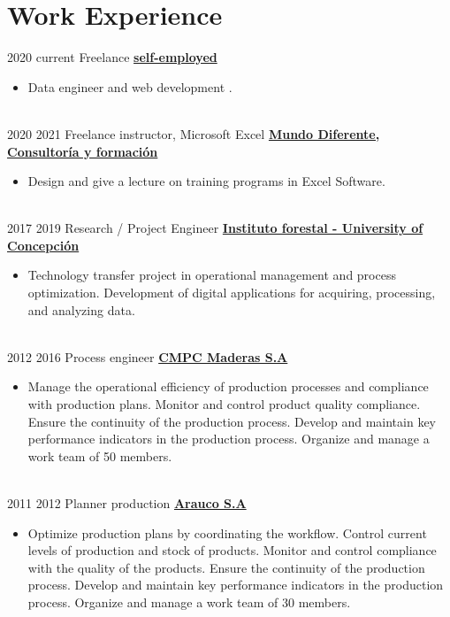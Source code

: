 \documentclass[letterpaper]{DS_class_file} %
\begin{document}
\section{Work Experience}
\begin{twenty}
		\twentyitem
	{2020}
	{current}
	{\hspace{0.2cm}Freelance}
	{\href{https://portfolio-mparraf.herokuapp.com/}{\hspace{0.05cm} \textbf{self-employed} }}
	{}
	{\begin{itemize}
			\item Data engineer and web development .
	\end{itemize}}
	\\
	\twentyitem
	{2020}
	{2021}
	{\hspace{0.2cm}Freelance instructor, Microsoft Excel}
	{\href{https://www.mundodiferente.cl/}{\hspace{0.05cm} \textbf{Mundo Diferente, Consultoría y formación} }}
	{}
	{\begin{itemize}
			\item Design and give a lecture on training programs in Excel Software.
	\end{itemize}}
	\\
	\twentyitem
	{2017}
	{2019}
	{\hspace{0.3cm}Research / Project Engineer}
	{\href{https://www.infor.cl/}{\hspace{0.05cm} \textbf{Instituto forestal -  University of Concepción} }}
	{}
	{\begin{itemize}
			\item Technology transfer project in operational management and process optimization. Development of digital applications for acquiring, processing, and analyzing data.
	\end{itemize}}
	\\
	\twentyitem
	{2012}
	{2016}
	{\hspace{0.3cm}Process engineer}
	{\href{https://www.cmpcmaderas.com/}{\textbf{CMPC Maderas S.A}}}
	{}
	{\begin{itemize}
			\item Manage the operational efficiency of production processes and compliance with production plans. Monitor and control product quality compliance. Ensure the continuity of the production process. Develop and maintain key performance indicators in the production process. Organize and manage a work team of 50 members.
	\end{itemize}}
	\\
	\twentyitem
	{2011}
	{2012}
	{\hspace{0.3cm}Planner production}
	{\href{https://www.arauco.cl/chile/}{\textbf{Arauco S.A}}}
	{}
	{\begin{itemize}
			\item Optimize production plans by coordinating the workflow. Control current levels of production and stock of products. Monitor and control compliance with the quality of the products. Ensure the continuity of the production process. Develop and maintain key performance indicators in the production process. Organize and manage a work team of 30 members.
	\end{itemize}}
\end{twenty}
\end{document}
